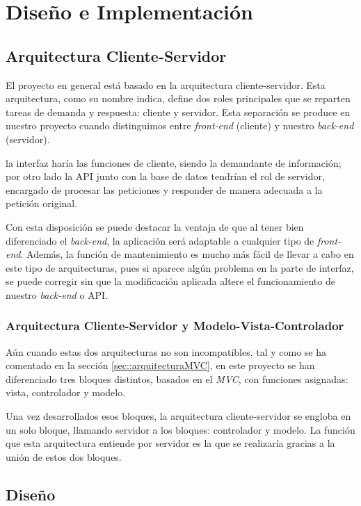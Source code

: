 \chapter{Diseño e Implementación}

\section{Arquitectura Cliente-Servidor}

El proyecto en general está basado en la arquitectura cliente-servidor\cite{clienteservidor}. Esta arquitectura, como su nombre indica, define dos roles principales que se reparten tareas de demanda y respuesta: cliente y servidor. Esta separación se produce en nuestro proyecto cuando distinguimos entre \textit{front-end} (cliente) y nuestro \textit{back-end} (servidor).

la interfaz haría las funciones de cliente, siendo la demandante de información; por otro lado la API junto con la base de datos tendrían el rol de servidor, encargado de procesar las peticiones y responder de manera adecuada a la petición original.

Con esta disposición se puede destacar la ventaja de que al tener bien diferenciado el \textit{back-end}, la aplicación será adaptable a cualquier tipo de \textit{front-end}. Además, la función de mantenimiento es mucho más fácil de llevar a cabo en este tipo de arquitecturas, pues si aparece algún problema en la parte de interfaz, se puede corregir sin que la modificación aplicada altere el funcionamiento de nuestro \textit{back-end} o API.

\subsection{Arquitectura Cliente-Servidor y Modelo-Vista-Controlador}

Aún cuando estas dos arquitecturas no son incompatibles, tal y como se ha comentado en la sección \ref{sec::arquitecturaMVC}, en este proyecto se han diferenciado tres bloques distintos, basados en el \textit{MVC}, con funciones asignadas: vista, controlador y modelo. 

Una vez desarrollados esos bloques, la arquitectura cliente-servidor se engloba en un solo bloque, llamando servidor a los bloques: controlador y modelo. La función que esta arquitectura entiende por servidor es la que se realizaría gracias a la unión de estos dos bloques.

\section{Diseño}

